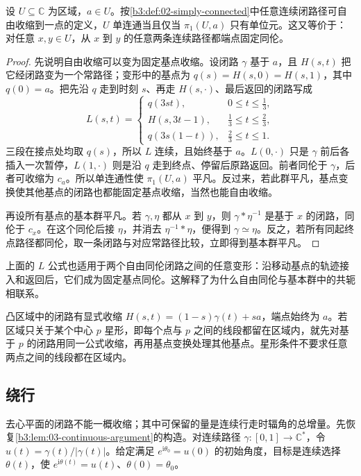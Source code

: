 \begin{proposition}\label{b3:prop:09-simply-connected-paths}
设 \(U\subseteq\mathbb C\) 为区域，\(a\in U\)。按\cref{b3:def:02-simply-connected}中任意连续闭路径可自由收缩到一点的定义，\(U\) 单连通当且仅当 \(\pi_1(U,a)\) 只有单位元。这又等价于：对任意 \(x,y\in U\)，从 \(x\) 到 \(y\) 的任意两条连续路径都端点固定同伦。
\end{proposition}
\begin{proof}
先说明自由收缩可以变为固定基点收缩。设闭路 \(\gamma\) 基于 \(a\)，且 \(H(s,t)\) 把它经闭路变为一个常路径；变形中的基点为 \(q(s)=H(s,0)=H(s,1)\)，其中 \(q(0)=a\)。把先沿 \(q\) 走到时刻 \(s\)、再走 \(H(s,\cdot)\)、最后返回的闭路写成
\[
 L(s,t)=
 \begin{cases}
 q(3st),&0\le t\le\tfrac13,\\
 H(s,3t-1),&\tfrac13\le t\le\tfrac23,\\
 q(3s(1-t)),&\tfrac23\le t\le1.
 \end{cases}
\]
三段在接点处均取 \(q(s)\)，所以 \(L\) 连续，且始终基于 \(a\)。\(L(0,\cdot)\) 只是 \(\gamma\) 前后各插入一次暂停，\(L(1,\cdot)\) 则是沿 \(q\) 走到终点、停留后原路返回。前者同伦于 \(\gamma\)，后者可收缩为 \(c_a\)。所以单连通性使 \(\pi_1(U,a)\) 平凡。反过来，若此群平凡，基点变换使其他基点的闭路也都能固定基点收缩，当然也能自由收缩。

再设所有基点的基本群平凡。若 \(\gamma,\eta\) 都从 \(x\) 到 \(y\)，则 \(\gamma*\eta^{-1}\) 是基于 \(x\) 的闭路，同伦于 \(c_x\)。在这个同伦后接 \(\eta\)，并消去 \(\eta^{-1}*\eta\)，便得到 \(\gamma\simeq\eta\)。反之，若所有同起终点路径都同伦，取一条闭路与对应常路径比较，立即得到基本群平凡。
\end{proof}
上面的 \(L\) 公式也适用于两个自由同伦闭路之间的任意变形：沿移动基点的轨迹接入和返回后，它们成为固定基点同伦。这解释了为什么自由同伦与基本群中的共轭相联系。

\ProseParagraphBreak
凸区域中的闭路有显式收缩 \(H(s,t)=(1-s)\gamma(t)+sa\)，端点始终为 \(a\)。若区域只关于某个中心 \(p\) 星形，即每个点与 \(p\) 之间的线段都留在区域内，就先对基于 \(p\) 的闭路用同一公式收缩，再用基点变换处理其他基点。星形条件不要求任意两点之间的线段都在区域内。

\subsection{绕行}
\label{b3:subsec:090104}

去心平面的闭路不能一概收缩；其中可保留的量是连续行走时辐角的总增量。先恢复\cref{b3:lem:03-continuous-argument}的构造。对连续路径 \(\gamma:[0,1]\to\mathbb C^*\)，令 \(u(t)=\gamma(t)/|\gamma(t)|\)。给定满足 \(e^{\mathrm i\theta_0}=u(0)\) 的初始角度，目标是连续选择 \(\theta(t)\)，使 \(e^{\mathrm i\theta(t)}=u(t)\)、\(\theta(0)=\theta_0\)。

